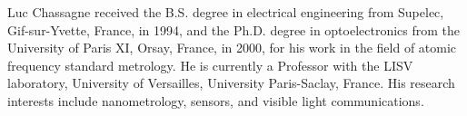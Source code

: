\documentclass[journal]{IEEEtran}
\begin{document}
\begin{IEEEbiographynophoto}{Luc Chassagne}
received the B.S. degree in electrical engineering from Supelec, Gif-sur-Yvette, France, in 1994, and the Ph.D. degree in optoelectronics from the University of Paris XI, Orsay, France, in 2000, for his work in the field of atomic frequency standard metrology. He is currently a Professor with the LISV laboratory, University of Versailles, University Paris-Saclay, France. His research interests include nanometrology, sensors, and visible light communications.
\end{IEEEbiographynophoto}
\end{document}
